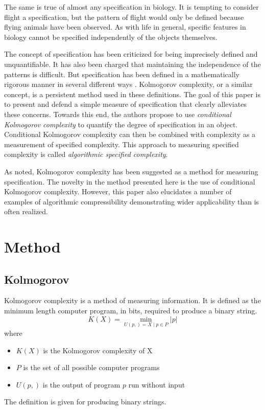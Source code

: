 The same is true of almost any specification in biology.
It is tempting to consider flight a specification, but the pattern of flight would only be defined because flying animals have been observed.
As with life in general, specific features in biology cannot be specified independently of the objects themselves.

The concept of specification has been criticized for being imprecisely defined and unquantifiable.
It has also been charged that maintaining the independence of the patterns is difficult.
But specification has been defined in a mathematically rigorous manner in several different ways \citep{Dembski1998, Dembski2002, Dembski2005a}.
Kolmogorov complexity, or a similar concept, is a persistent method used in these definitions.
The goal of this paper is to present and defend a simple measure of specification that clearly alleviates these concerns.
Towards this end, the authors propose to use \textit{conditional Kolmogorov complexity} to quantify the degree of specification in an object.
Conditional Kolmogorov complexity can then be combined with complexity as a measurement of specified complexity. This approach to measuring specified complexity is called \textit{algorithmic specified complexity}.

As noted, Kolmogorov complexity has been suggested as a method for measuring specification.
The novelty in the method presented here is the use of conditional Kolmogorov complexity.
However, this paper also elucidates a number of examples of algorithmic compressibility demonstrating wider applicability than is often realized.

\section{Method}

\subsection{Kolmogorov}

Kolmogorov complexity is a method of measuring information.
It is defined as the minimum length computer program, in bits, required to produce a binary string.
\begin{equation}
    K(X) = \min_{U(p,) = X \mid p \in P} |p|
\end{equation} where
\begin{itemize}
    \item $K(X)$ is the Kolmogorov complexity of X
    \item $P$ is the set of all possible computer programs
    \item $U(p,)$ is the output of program $p$ run without input
\end{itemize}
The definition is given for producing binary strings.

